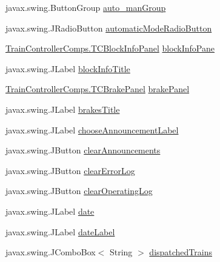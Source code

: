 \begin{DoxyCompactItemize}
\item 
javax.\+swing.\+Button\+Group \hyperlink{classTrainControllerComps_1_1TrainController_ab5fbed6e441dced7b29d48de0b23dbd8}{auto\+\_\+man\+Group}
\item 
javax.\+swing.\+J\+Radio\+Button \hyperlink{classTrainControllerComps_1_1TrainController_a446930f48715be996557881863b5b1ae}{automatic\+Mode\+Radio\+Button}
\item 
\hyperlink{classTrainControllerComps_1_1TCBlockInfoPanel}{Train\+Controller\+Comps.\+T\+C\+Block\+Info\+Panel} \hyperlink{classTrainControllerComps_1_1TrainController_a2fda59591e4f6e390edcdf49e46b884d}{block\+Info\+Pane}
\item 
javax.\+swing.\+J\+Label \hyperlink{classTrainControllerComps_1_1TrainController_a709b921cc3bd6e2d2cf36383de80d34c}{block\+Info\+Title}
\item 
\hyperlink{classTrainControllerComps_1_1TCBrakePanel}{Train\+Controller\+Comps.\+T\+C\+Brake\+Panel} \hyperlink{classTrainControllerComps_1_1TrainController_a6fef4933adda13e5c7cb947f84ea92d3}{brake\+Panel}
\item 
javax.\+swing.\+J\+Label \hyperlink{classTrainControllerComps_1_1TrainController_a2ab25abd71b987aac0291179ca1642bd}{brakes\+Title}
\item 
javax.\+swing.\+J\+Label \hyperlink{classTrainControllerComps_1_1TrainController_ad6c724ce157d7a176bc734b843d4fabd}{choose\+Announcement\+Label}
\item 
javax.\+swing.\+J\+Button \hyperlink{classTrainControllerComps_1_1TrainController_a7bacd9a12dc33d521f2403eb6f843b43}{clear\+Announcements}
\item 
javax.\+swing.\+J\+Button \hyperlink{classTrainControllerComps_1_1TrainController_a8b37eb23080104688c7bda4360f2e8b8}{clear\+Error\+Log}
\item 
javax.\+swing.\+J\+Button \hyperlink{classTrainControllerComps_1_1TrainController_a4d8b68f88d337d250538897ba263f363}{clear\+Operating\+Log}
\item 
javax.\+swing.\+J\+Label \hyperlink{classTrainControllerComps_1_1TrainController_a934803a9f364951d6983afb3c9773cd9}{date}
\item 
javax.\+swing.\+J\+Label \hyperlink{classTrainControllerComps_1_1TrainController_aedfae9b0a9b925ec4af68b1139129edf}{date\+Label}
\item 
javax.\+swing.\+J\+Combo\+Box$<$ String $>$ \hyperlink{classTrainControllerComps_1_1TrainController_afe2b3df9629e79d6bcf87cac60ad2410}{dispatched\+Trains}
\item 

\end{DoxyCompactItemize}
